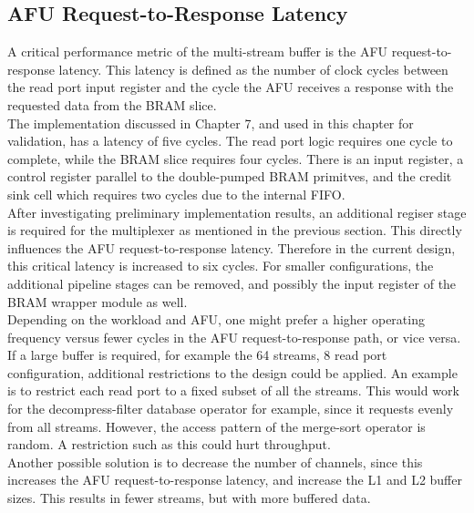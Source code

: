 \subsection{AFU Request-to-Response Latency}
A critical performance metric of the multi-stream buffer is the AFU request-to-response latency. This latency is defined as the number of clock cycles between the read port input register and the cycle the AFU receives a response with the requested data from the BRAM slice.\\
The implementation discussed in Chapter 7, and used in this chapter for validation, has a latency of five cycles. The read port logic requires one cycle to complete, while the BRAM slice requires four cycles. There is an input register, a control register parallel to the double-pumped BRAM primitves, and the credit sink cell which requires two cycles due to the internal FIFO.\\
After investigating preliminary implementation results, an additional regiser stage is required for the multiplexer as mentioned in the previous section. This directly influences the AFU request-to-response latency. Therefore in the current design, this critical latency is increased to six cycles. For smaller configurations, the additional pipeline stages can be removed, and possibly the input register of the BRAM wrapper module as well.\\
Depending on the workload and AFU, one might prefer a higher operating frequency versus fewer cycles in the AFU request-to-response path, or vice versa. If a large buffer is required, for example the 64 streams, 8 read port configuration, additional restrictions to the design could be applied. An example is to restrict each read port to a fixed subset of all the streams. This would work for the decompress-filter database operator for example, since it requests evenly from all streams. However, the access pattern of the merge-sort operator is random. A restriction such as this could hurt throughput.\\
Another possible solution is to decrease the number of channels, since this increases the AFU request-to-response latency, and increase the L1 and L2 buffer sizes. This results in fewer streams, but with more buffered data.

